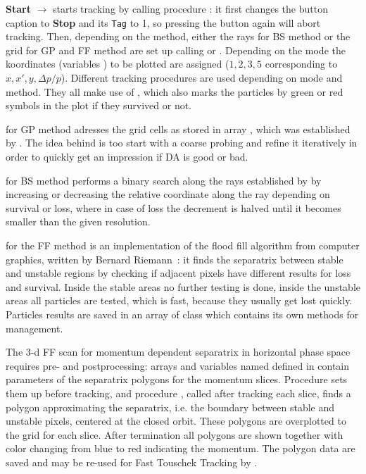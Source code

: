 \documentclass[12pt]{article}
\newcommand\code[1]{{\tt #1}}
\newcommand{\ofld}[1]{\colorbox{black!15}{{{\color{black}\bf #1}}}}
\newcommand\guico[1]{{\color{blue}\code{#1}}}
\newcommand{\unico}[1]{{\color{burntorange}\code{#1}}}
\newcommand{\evcod}[2]{\ofld{#1} $\rightarrow$ \guico{#2}}
\newcommand{\opagui}[1]{\colorbox{blue!20}{{\color{black}\code{#1}}}}
\newcommand{\ogui}[1]{\hyperref[#1]{\opagui{#1}}}
\newcommand{\opauni}[1]{\colorbox{orange!30}{{\color{black}\code{#1}}}}
\newcommand{\ouni}[1]{\hyperref[#1]{\opauni{#1}}}
\newcommand{\feature}[1]{{\color{cadmiumgreen} #1}}
\begin{document}
\evcod{Start}{butStartClick} starts tracking by calling procedure \guico{DATracking}: it first changes the button caption to \ofld{Stop} and its \code{Tag} to 1, so pressing the button again will abort tracking. Then, depending on the method, either the rays for BS method or the grid for GP and FF method are set up calling \guico{DARaySetup} or \guico{DAGridSetup}. Depending on the mode the koordinates (variables \guico{ko...}) to be plotted are assigned ($1,2,3,5$ corresponding to $x,x',y,\Delta p/p$).  Different tracking procedures are used depending on mode and method. They all make use of \unico{DASingleTracking}, which also marks the particles by green or red symbols in the plot if they survived or not.

\guico{DATrackingClassicGrid} for GP method adresses the grid cells as stored in array \guico{dagord}, which was established by \guico{DAGridSetup}. \feature{The idea behind is too start with a coarse probing and refine it iteratively in order to quickly get an impression if DA is good or bad.} 

\guico{DATrackingBinRays} for BS method performs a binary search along the rays established by \guico{DARaySetup} by increasing or decreasing the relative coordinate along the ray depending on survival or loss, where in case of loss the decrement is halved until it becomes smaller than the given resolution. 

\guico{DATrackingFillToolGrid} for the FF method is an implementation of the flood fill algorithm from computer graphics, written by Bernard Riemann~\cite{FTTpaper}: it finds the separatrix between stable and unstable regions by checking if adjacent pixels have different results for loss and survival. Inside the stable areas no further testing is done, inside the unstable areas all particles are tested, which is fast, because they usually get lost quickly. Particles results are saved in an array \guico{queue} of class \guico{TIndexQueue} which contains its own methods for management.

The 3-d FF scan for momentum dependent separatrix in horizontal phase space requires pre- and postprocessing: arrays and variables named \unico{Flo...} defined in \ouni{tracklib} contain parameters of the separatrix polygons for the momentum slices. Procedure \guico{FloPinit} sets them up before tracking, and procedure \guico{FloPoly}, called after tracking each slice, finds a polygon approximating the separatrix, i.e. the boundary between stable and unstable pixels, centered at the closed orbit. These polygons are overplotted to the grid for each slice. After termination all polygons are shown together with color changing from blue to red indicating the momentum. The polygon data are saved and may be re-used for Fast Touschek Tracking by \ogui{opatracktt}.
\end{document}
